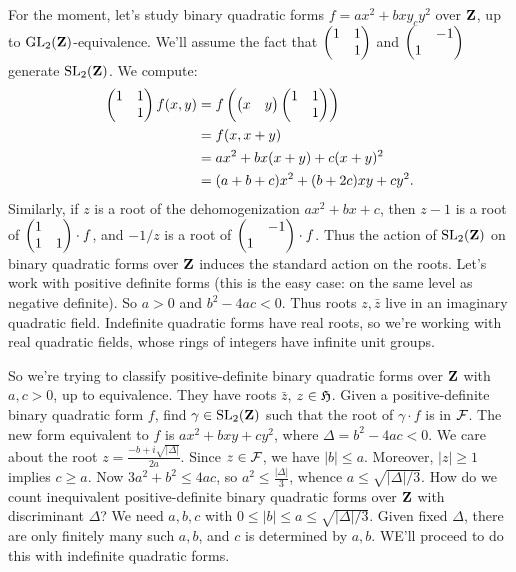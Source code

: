For the moment, let's study binary quadratic forms $f=a x^2+b x y_c y^2$ 
over $\mathbf{Z}$, up to $\operatorname{GL}_2(\mathbf{Z})$-equivalence. We'll assume the fact that 
$\begin{pmatrix} 1 & 1 \\  & 1 \end{pmatrix}$ and $\begin{pmatrix}  & -1 \\ 1 &  \end{pmatrix}$ generate $\operatorname{SL}_2(\mathbf{Z})$. We compute: 
\begin{align*}
  \begin{pmatrix} 1 & 1 \\  & 1 \end{pmatrix} f(x,y) &= f\left(\begin{pmatrix} x & y \end{pmatrix} \begin{pmatrix} 1 & 1 \\  & 1 \end{pmatrix}\right) \\
    &= f(x,x+y) \\
    &= a x^2+b x(x+y)+c(x+y)^2 \\
    &= (a+b+c) x^2 +(b+2 c) x y + c y^2 .
\end{align*}
Similarly, if $z$ is a root of the dehomogenization 
$a x^2+b x+c$, then $z-1$ is a root of $\begin{pmatrix} 1 &  \\ 1 & 1 \end{pmatrix}\cdot f$, and 
$-1/z$ is a root of $\begin{pmatrix}  & -1 \\ 1 &  \end{pmatrix}\cdot f$. Thus the action of $\operatorname{SL}_2(\mathbf{Z})$ 
on binary quadratic forms over $\mathbf{Z}$ induces the standard action on the roots. 
Let's work with positive definite forms (this is the easy case: on the same 
level as negative definite). So $a>0$ and $b^2-4 a c<0$. Thus roots 
$z,\bar z$ live in an imaginary quadratic field. Indefinite quadratic forms 
have real roots, so we're working with real quadratic fields, whose rings of 
integers have infinite unit groups. 

So we're trying to classify positive-definite binary quadratic forms over $\mathbf{Z}$ 
with $a,c>0$, up to equivalence. They have roots $\bar z$, $z\in \mathfrak{H}$. 
Given a positive-definite binary quadratic form $f$, find 
$\gamma\in \operatorname{SL}_2(\mathbf{Z})$ such that the root of $\gamma\cdot f$ is in $\mathcal{F}$. The 
new form equivalent to $f$ is $a x^2+b x y+c y^2$, where 
$\Delta=b^2-4 a c<0$. We care about the root 
$z=\frac{-b+i\sqrt{|\Delta|}}{2a}$. Since $z\in \mathcal{F}$, we have 
$|b|\leqslant a$. Moreover, $|z|\geqslant 1$ implies 
$c\geqslant a$. Now 
$3 a^2+b^2\leqslant 4 a c$, so 
$a^2\leqslant \frac{|\Delta|}{3}$, whence $a\leqslant \sqrt{|\Delta|/3}$. 
How do we count inequivalent positive-definite binary quadratic forms over 
$\mathbf{Z}$ with discriminant $\Delta$? We need $a,b,c$ with 
$0\leqslant |b|\leqslant a \leqslant \sqrt{|\Delta|/3}$. Given fixed 
$\Delta$, there are only finitely many such $a,b$, and $c$ is determined by 
$a,b$. WE'll proceed to do this with indefinite quadratic forms. 




